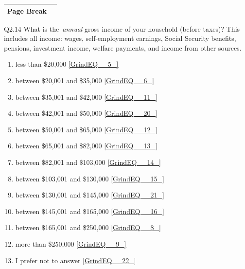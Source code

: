 \documentclass{article} %
\begin{document}
\noindent 

\noindent 

\begin{tabular}{|p{0.6in}|p{3.8in}|} \hline 
Page Break &  \\ \hline 
\end{tabular}

\eject 

\noindent 

\noindent Q2.14 What is the~\textit{annual }gross income of your household (before taxes)?  This includes all income: wages, self-employment earnings, Social Security benefits, pensions, investment income, welfare payments, and income from other sources.

\begin{enumerate}
\item  less than \$20,000  \eqref{GrindEQ__5_} 

\item  between \$20,001 and \$35,000  \eqref{GrindEQ__6_} 

\item  between \$35,001 and \$42,000  \eqref{GrindEQ__11_} 

\item  between \$42,001 and \$50,000  \eqref{GrindEQ__20_} 

\item  between \$50,001 and \$65,000  \eqref{GrindEQ__12_} 

\item  between \$65,001 and \$82,000  \eqref{GrindEQ__13_} 

\item  between \$82,001 and \$103,000  \eqref{GrindEQ__14_} 

\item  between \$103,001 and \$130,000  \eqref{GrindEQ__15_} 

\item  between \$130,001 and \$145,000  \eqref{GrindEQ__21_} 

\item  between \$145,001 and \$165,000  \eqref{GrindEQ__16_} 

\item  between \$165,001 and \$250,000  \eqref{GrindEQ__8_} 

\item  more than \$250,000  \eqref{GrindEQ__9_} 

\item  I prefer not to answer  \eqref{GrindEQ__22_} 
\end{enumerate}
\end{document}
